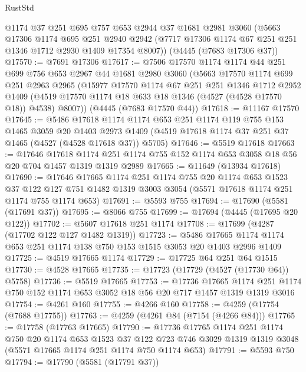 \begin{lexlean}{RustStd}
\begin{coremodule}
{\begin{coremodule}
{{{{{{{{{{{{{{{{{{{{{{{{{{{{{{{{{{{{{{    @1174
    @37
    @251
    @695
    @757
    @653
    @2944
    @37
    @1681
    @2981
    @3060
    (@5663
      @17306
      @1174
      @695
      @251
      @2940
      @2942
      (@7717 @17306 @1174 @67 @251 @251 @1346 @1712 @2930 @1409 @17354 @8007))
    (@4445 (@7683 @17306 @37))
@17570 := @7691 @17306
@17617 := @7506
    @17570
    @1174
    @1174
    @44
    @251
    @699
    @756
    @653
    @2967
    @44
    @1681
    @2980
    @3060
    (@5663
      @17570
      @1174
      @699
      @251
      @2963
      @2965
      (@15977
        @17570
        @1174
        @67
        @251
        @251
        @1346
        @1712
        @2952
        @1409
        (@4519 @17570 @1174 @18 @633 @18 @1346 (@4527 (@4528 @17570 @18)) @4538)
        @8007))
    (@4445 (@7683 @17570 @44))
@17618 := @11167 @17570
@17645 := @5486
    @17618
    @1174
    @1174
    @653
    @251
    @1174
    @119
    @755
    @153
    @1465
    @3059
    @20
    @1403
    @2973
    @1409
    (@4519 @17618 @1174 @37 @251 @37 @1465 (@4527 (@4528 @17618 @37)) @5705)
@17646 := @5519 @17618
@17663 := @17646
    @17618
    @1174
    @251
    @1174
    @755
    @152
    @1174
    @653
    @3058
    @18
    @56
    @20
    @704
    @1457
    @1319
    @1319
    @2989
@17665 := @11649 (@13934 @17618)
@17690 := @17646
    @17665
    @1174
    @251
    @1174
    @755
    @20
    @1174
    @653
    @1523
    @37
    @122
    @127
    @751
    @1482
    @1319
    @3003
    @3054
    (@5571 @17618 @1174 @251 @1174 @755 @1174 @653)
@17691 := @5593 @755
@17694 := @17690 (@5581 (@17691 @37))
@17695 := @8066 @755
@17699 := @17694 (@4445 (@17695 @20 @122))
@17702 := @5607 @17618 @251 @1174
@17708 := @17699 (@4287 (@17702 @122 @127 @1482 @1319))
@17723 := @5486 @17665 @1174 @1174 @653 @251 @1174 @138 @750 @153 @1515 @3053 @20 @1403 @2996 @1409
@17725 := @4519 @17665 @1174
@17729 := @17725 @64 @251 @64 @1515
@17730 := @4528 @17665
@17735 := @17723 (@17729 (@4527 (@17730 @64)) @5758)
@17736 := @5519 @17665
@17753 := @17736
    @17665
    @1174
    @251
    @1174
    @750
    @152
    @1174
    @653
    @3052
    @18
    @56
    @20
    @717
    @1457
    @1319
    @1319
    @3016
@17754 := @4261 @160
@17755 := @4266 @160
@17758 := @4259 (@17754 (@7688 @17755))
@17763 := @4259 (@4261 @84 (@7154 (@4266 @84)))
@17765 := @17758 (@17763 @17665)
@17790 := @17736
    @17765
    @1174
    @251
    @1174
    @750
    @20
    @1174
    @653
    @1523
    @37
    @122
    @723
    @746
    @3029
    @1319
    @1319
    @3048
    (@5571 @17665 @1174 @251 @1174 @750 @1174 @653)
@17791 := @5593 @750
@17794 := @17790 (@5581 (@17791 @37))
}}}}}}}}}}}}}}}}}}}}}}}}}}}}}}}}}}}}}}
\end{coremodule}}
\end{coremodule}
\end{lexlean}
